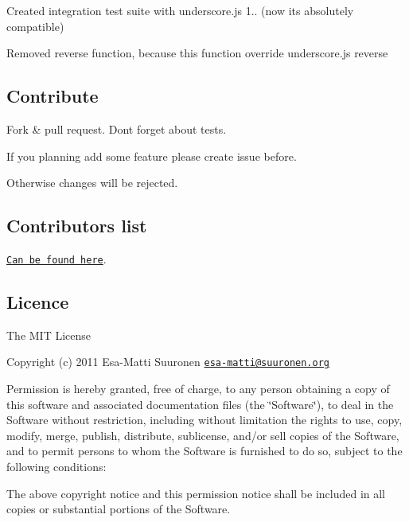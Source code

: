 \begin{DoxyItemize}
\item Created integration test suite with underscore.\+js 1.. (now it\textquotesingle{}s absolutely compatible)
\item Removed \textquotesingle{}reverse\textquotesingle{} function, because this function override underscore.\+js \textquotesingle{}reverse\textquotesingle{}
\end{DoxyItemize}

\subsection*{Contribute}


\begin{DoxyItemize}
\item Fork \& pull request. Don\textquotesingle{}t forget about tests.
\item If you planning add some feature please create issue before.
\end{DoxyItemize}

Otherwise changes will be rejected.

\subsection*{Contributors list}

\href{https://github.com/epeli/underscore.string/graphs/contributors}{\tt Can be found here}.

\subsection*{Licence}

The M\+IT License

Copyright (c) 2011 Esa-\/\+Matti Suuronen \href{mailto:esa-matti@suuronen.org}{\tt esa-\/matti@suuronen.\+org}

Permission is hereby granted, free of charge, to any person obtaining a copy of this software and associated documentation files (the \char`\"{}\+Software\char`\"{}), to deal in the Software without restriction, including without limitation the rights to use, copy, modify, merge, publish, distribute, sublicense, and/or sell copies of the Software, and to permit persons to whom the Software is furnished to do so, subject to the following conditions\+:

The above copyright notice and this permission notice shall be included in all copies or substantial portions of the Software.

